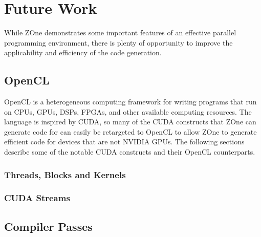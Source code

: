 \section*{Future Work}

While ZOne demonstrates some important features of an effective parallel
programming environment, there is plenty of opportunity to improve the
applicability and efficiency of the code generation.

\subsection*{OpenCL}

OpenCL is a heterogeneous computing framework for writing programs that run
on CPUs, GPUs, DSPs, FPGAs, and other available computing resources. The
language is inspired by CUDA, so many of the CUDA constructs that ZOne can
generate code for can easily be retargeted to OpenCL to allow ZOne to generate
efficient code for devices that are not NVIDIA GPUs. The following sections
describe some of the notable CUDA constructs and their OpenCL counterparts.

\subsubsection*{Threads, Blocks and Kernels}

\subsubsection*{CUDA Streams}

\subsection*{Compiler Passes}
